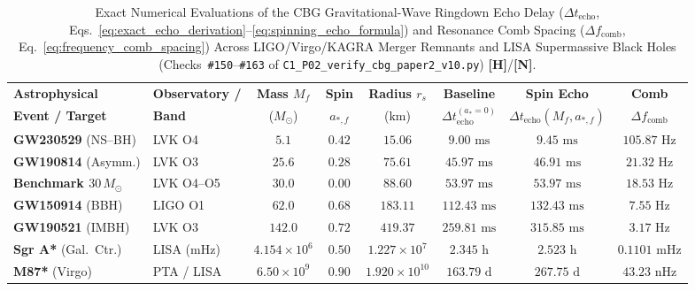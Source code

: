 \documentclass[11pt,a4paper]{article}
\newcommand{\catH}{\textbf{\textcolor{orange!85!black}{[H]}}}
\newcommand{\catN}{\textbf{\textcolor{teal!75!black}{[N]}}}
\theoremstyle{plain}
\theoremstyle{definition}
\theoremstyle{remark}
\numberwithin{equation}{section}
\begin{document}
\begin{table}[H]
\centering
\caption{Exact Numerical Evaluations of the CBG Gravitational-Wave Ringdown Echo Delay ($\Delta t_{\text{echo}}$, Eqs.~\ref{eq:exact_echo_derivation}--\ref{eq:spinning_echo_formula}) and Resonance Comb Spacing ($\Delta f_{\text{comb}}$, Eq.~\ref{eq:frequency_comb_spacing}) Across LIGO/Virgo/KAGRA Merger Remnants and LISA Supermassive Black Holes (Checks~\texttt{\#150}--\texttt{\#163} of \texttt{C1\_P02\_verify\_cbg\_paper2\_v10.py}) \catH/\catN.}
\label{tab:ligo_lisa_echo_predictions}
\vspace{0.10cm}
\footnotesize
\setlength{\tabcolsep}{3.5pt}
\renewcommand{\arraystretch}{1.26}
\begin{tabularx}{\textwidth}{@{} Y l c c c c c c @{}}
\toprule
\textbf{Astrophysical} & \textbf{Observatory /} & \textbf{Mass $M_f$} & \textbf{Spin} & \textbf{Radius $r_s$} & \textbf{Baseline} & \textbf{Spin Echo} & \textbf{Comb} \\
\textbf{Event / Target} & \textbf{Band} & ($M_\odot$) & $a_{*,f}$ & ($\text{km}$) & $\Delta t_{\text{echo}}^{(a_*=0)}$ & $\Delta t_{\text{echo}}(M_f, a_{*,f})$ & $\Delta f_{\text{comb}}$ \\
\midrule
\textbf{GW230529} (NS--BH) & LVK O4 & $5.1$ & $0.42$ & $15.06$ & $9.00\text{ ms}$ & $9.45\text{ ms}$ & $105.87\text{ Hz}$ \\
\textbf{GW190814} (Asymm.) & LVK O3 & $25.6$ & $0.28$ & $75.61$ & $45.97\text{ ms}$ & $46.91\text{ ms}$ & $21.32\text{ Hz}$ \\
\textbf{Benchmark $30\,M_\odot$} & LVK O4--O5 & $30.0$ & $0.00$ & $88.60$ & $53.97\text{ ms}$ & $53.97\text{ ms}$ & $18.53\text{ Hz}$ \\
\textbf{GW150914} (BBH) & LIGO O1 & $62.0$ & $0.68$ & $183.11$ & $112.43\text{ ms}$ & $132.43\text{ ms}$ & $7.55\text{ Hz}$ \\
\textbf{GW190521} (IMBH) & LVK O3 & $142.0$ & $0.72$ & $419.37$ & $259.81\text{ ms}$ & $315.85\text{ ms}$ & $3.17\text{ Hz}$ \\
\textbf{Sgr A*} (Gal.\ Ctr.) & LISA ($\text{mHz}$) & $4.154 \times 10^6$ & $0.50$ & $1.227 \times 10^7$ & $2.345\text{ h}$ & $2.523\text{ h}$ & $0.1101\text{ mHz}$ \\
\textbf{M87*} (Virgo) & PTA / LISA & $6.50 \times 10^9$ & $0.90$ & $1.920 \times 10^{10}$ & $163.79\text{ d}$ & $267.75\text{ d}$ & $43.23\text{ nHz}$ \\
\bottomrule
\end{tabularx}
\end{table}
\end{document}
